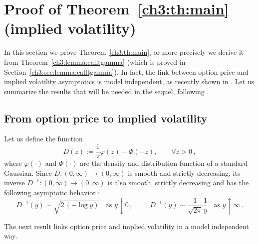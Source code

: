 \documentclass[a4paper,reqno,11pt]{amsart}
\numberwithin{equation}{section}
\renewcommand{\phi}{\varphi}
\begin{document}
\section{Proof of Theorem~\ref{ch3:th:main} (implied volatility)}
\label{ch3:sec:th:main}

In this section we prove Theorem~\ref{ch3:th:main}, or more precisely
we derive it from Theorem~\ref{ch3:lemma:calltgamma} 
(which is proved in Section~\ref{ch3:sec:lemma:calltgamma}). 
In fact, the link between option price and implied volatility asymptotics
is model independent, as recently shown in \cite{cf:GL}.
Let us summarize the results that will be needed in the sequel, following \cite{cf:CC}.

\subsection{From option price to implied volatility}
\label{ch3:sec:reminders2}

Let us define the function
\begin{equation} \label{ch2:eq:D}
	D(z) := \frac{1}{z}\phi(z) - \Phi(-z) , \qquad \forall z > 0 \,,
\end{equation}
where $\phi(\cdot)$ and $\Phi(\cdot)$ 
are the density and distribution function of a standard Gaussian.
Since $D: (0,\infty) \to (0,\infty)$ is smooth and strictly decreasing,
its inverse $D^{-1}:(0,\infty) \to (0,\infty)$ is also smooth, strictly decreasing and 
has the following asymptotic behavior \cite[\S 4.1]{cf:CC}:
\begin{equation}\label{ch2:eq:Das}
	D^{-1}(y) \sim \sqrt{2 \, (-\log y)}  \ \ \ \
	\text{as } y \downarrow 0  \,, \quad \quad \ \
	D^{-1}(y) \sim \frac{1}{\sqrt{2\pi}} \frac{1}{y} \ \ \ \
	\text{as } y \uparrow \infty\,.
\end{equation}

The next result links
option price and implied volatility in a model independent way.
\end{document}
